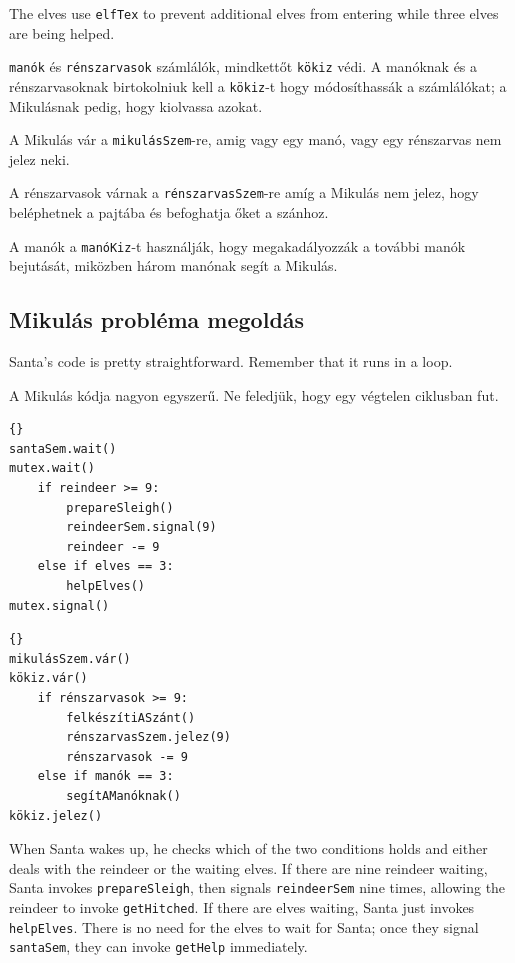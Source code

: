 \documentclass{book}
\newcommand{\clearemptydoublepage}{\newpage\cleardoublepage}
\begin{document}
The elves use {\tt elfTex} to prevent additional elves from
entering while three elves are being helped.

{\tt manók} és {\tt rénszarvasok} számlálók,
mindkettőt {\tt kökiz} védi.  A manóknak és a rénszarvasoknak birtokolniuk kell a
{\tt kökiz}-t hogy módosíthassák a számlálókat; a Mikulásnak pedig, hogy kiolvassa azokat.

A Mikulás vár a {\tt mikulásSzem}-re, amig vagy egy manó, vagy egy rénszarvas nem jelez neki.

A rénszarvasok várnak a {\tt rénszarvasSzem}-re amíg a Mikulás nem jelez, hogy beléphetnek
a pajtába és befoghatja őket a szánhoz.

A manók a {\tt manóKiz}-t használják, hogy megakadályozzák a további
manók bejutását, miközben három manónak segít a Mikulás.

\clearemptydoublepage
\subsection{Mikulás probléma megoldás}

Santa's code is pretty straightforward.  Remember that it
runs in a loop.

A Mikulás kódja nagyon egyszerű. Ne feledjük, hogy egy végtelen ciklusban fut.


\begin{lstlisting}[title={Santa problem solution (Santa)}]{}
santaSem.wait()
mutex.wait()
    if reindeer >= 9:
        prepareSleigh()
        reindeerSem.signal(9)
        reindeer -= 9
    else if elves == 3:
        helpElves()
mutex.signal()
\end{lstlisting}

\begin{lstlisting}[title={Mikulás probléma megoldás (Mikulás)}]{}
mikulásSzem.vár()
kökiz.vár()
    if rénszarvasok >= 9:
        felkészítiASzánt()
        rénszarvasSzem.jelez(9)
        rénszarvasok -= 9
    else if manók == 3:
        segítAManóknak()
kökiz.jelez()
\end{lstlisting}

When Santa wakes up, he checks which of the two conditions
holds and either deals with the reindeer or the waiting elves.
If there are nine reindeer waiting,
Santa invokes {\tt prepareSleigh}, then signals {\tt reindeerSem}
nine times, allowing the reindeer to invoke {\tt getHitched}.
If there are elves waiting, Santa just
invokes {\tt helpElves}.  There is no need for the elves to wait
for Santa; once they signal {\tt santaSem}, they can
invoke {\tt getHelp} immediately.
\end{document}
